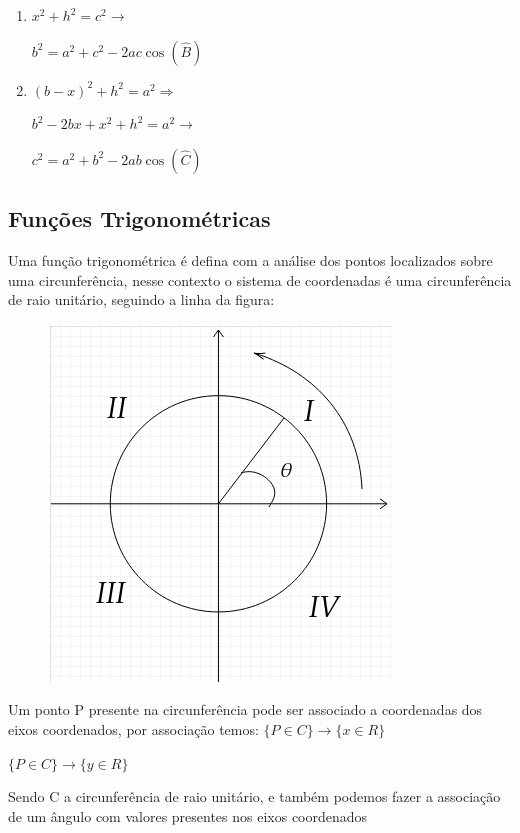 \begin{multicols*}{2}
\begin{enumerate}
        \item $x^2 + h^2 = c^2 \rightarrow$

              $b^2 = a^2 + c^2 - 2ac \cos (\widehat{B})$

        \item $(b - x)^2 + h^2 = a^2 \Rightarrow$

              $b^2 -2bx + x^2 + h^2 = a^2 \rightarrow$

              $ c^2 = a^2 + b^2 - 2ab \cos(\widehat{C}) $
    \end{enumerate}


    \subsection*{Funções Trigonométricas}

    Uma função trigonométrica é defina com a análise dos pontos localizados sobre uma circunferência, nesse contexto o sistema de coordenadas é uma circunferência de raio unitário, seguindo a linha da figura:

    \begin{figure}[H]
        \centering
        \includegraphics[scale=0.5]{assets/rafael/img31.png}
    \end{figure}

    Um ponto P presente na circunferência pode ser associado a coordenadas dos eixos coordenados, por associação temos:
    $\{ P \in C\} \rightarrow \{x \in R\}$

    $\{ P \in C\} \rightarrow \{y \in R\}$

    Sendo C a circunferência de raio unitário, e também podemos fazer a associação de um ângulo com valores presentes nos eixos coordenados


\end{multicols*}
